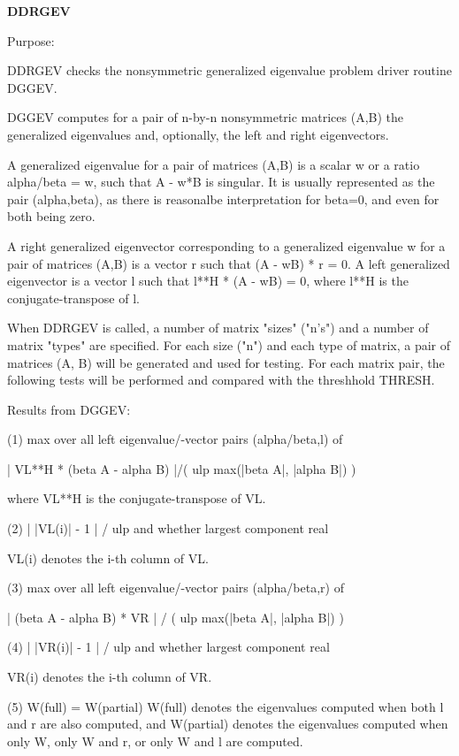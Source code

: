{\bfseries D\+D\+R\+G\+E\+V} 

\begin{DoxyParagraph}{Purpose\+: }
\begin{DoxyVerb} DDRGEV checks the nonsymmetric generalized eigenvalue problem driver
 routine DGGEV.

 DGGEV computes for a pair of n-by-n nonsymmetric matrices (A,B) the
 generalized eigenvalues and, optionally, the left and right
 eigenvectors.

 A generalized eigenvalue for a pair of matrices (A,B) is a scalar w
 or a ratio  alpha/beta = w, such that A - w*B is singular.  It is
 usually represented as the pair (alpha,beta), as there is reasonalbe
 interpretation for beta=0, and even for both being zero.

 A right generalized eigenvector corresponding to a generalized
 eigenvalue  w  for a pair of matrices (A,B) is a vector r  such that
 (A - wB) * r = 0.  A left generalized eigenvector is a vector l such
 that l**H * (A - wB) = 0, where l**H is the conjugate-transpose of l.

 When DDRGEV is called, a number of matrix "sizes" ("n's") and a
 number of matrix "types" are specified.  For each size ("n")
 and each type of matrix, a pair of matrices (A, B) will be generated
 and used for testing.  For each matrix pair, the following tests
 will be performed and compared with the threshhold THRESH.

 Results from DGGEV:

 (1)  max over all left eigenvalue/-vector pairs (alpha/beta,l) of

      | VL**H * (beta A - alpha B) |/( ulp max(|beta A|, |alpha B|) )

      where VL**H is the conjugate-transpose of VL.

 (2)  | |VL(i)| - 1 | / ulp and whether largest component real

      VL(i) denotes the i-th column of VL.

 (3)  max over all left eigenvalue/-vector pairs (alpha/beta,r) of

      | (beta A - alpha B) * VR | / ( ulp max(|beta A|, |alpha B|) )

 (4)  | |VR(i)| - 1 | / ulp and whether largest component real

      VR(i) denotes the i-th column of VR.

 (5)  W(full) = W(partial)
      W(full) denotes the eigenvalues computed when both l and r
      are also computed, and W(partial) denotes the eigenvalues
      computed when only W, only W and r, or only W and l are
      computed.


\end{DoxyVerb}
\end{DoxyParagraph}

